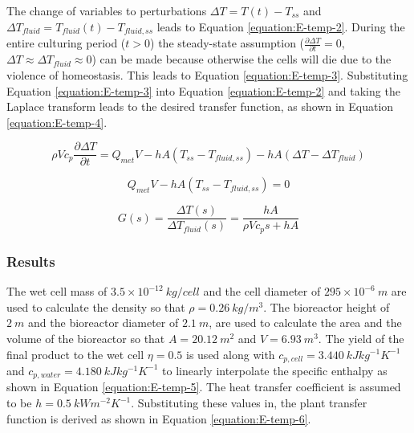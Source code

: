 The change of variables to perturbations $\Delta T = T(t) - T_{ss}$ and $\Delta T_{fluid} = T_{fluid}(t) - T_{fluid, ss}$ leads to Equation \ref{equation:E-temp-2}. During the entire culturing period ($t>0$) the steady-state assumption ($\frac{\partial \Delta T}{\partial t} = 0$, $\Delta T \approx \Delta T_{fluid} \approx 0$) can be made because otherwise the cells will die due to the violence of homeostasis. This leads to Equation \ref{equation:E-temp-3}. Substituting Equation \ref{equation:E-temp-3} into Equation \ref{equation:E-temp-2} and taking the Laplace transform leads to the desired transfer function, as shown in Equation \ref{equation:E-temp-4}.

\vspace{-5mm}
\begin{equation}
    \rho V c_p \frac{\partial \Delta T}{\partial t} = Q_{met} V - hA(T_{ss} - T_{fluid, ss}) - hA(\Delta T - \Delta T_{fluid})
    \label{equation:E-temp-2}
\end{equation}

\vspace{-10mm}
\begin{equation}
    Q_{met} V - hA(T_{ss} - T_{fluid, ss}) = 0
    \label{equation:E-temp-3}
\end{equation}

\vspace{-10mm}
\begin{equation}
    G(s) = \frac{\Delta T(s)}{\Delta T_{fluid}(s)} = \frac{hA}{\rho V c_p s + hA}
    \label{equation:E-temp-4}
\end{equation}

\subsubsection{Results}




The wet cell mass of $3.5 \times 10^{-12} \ kg/cell$ and the cell diameter of $295 \times 10^{-6} \ m$ \cite{E-Furuhashi2021} are used to calculate the density so that $\rho = 0.26 \ kg/m^3$. The bioreactor height of $2 \ m$ and the bioreactor diameter of $2.1 \ m$, are used to calculate the area and the volume of the bioreactor so that $A = 20.12 \ m^2$ and $V = 6.93 \ m^3$. The yield of the final product to the wet cell $\eta = 0.5$ is used along with $c_{p, cell} = 3.440 \ kJ kg^{-1} K^{-1}$ \cite{E-Fellows2009} and $c_{p, water} = 4.180 \ kJ kg^{-1} K^{-1}$ to linearly interpolate the specific enthalpy as shown in Equation \ref{equation:E-temp-5}. The heat transfer coefficient is assumed to be $h = 0.5 \ kW m^{-2} K^{-1}$. Substituting these values in, the plant transfer function is derived as shown in Equation \ref{equation:E-temp-6}.

